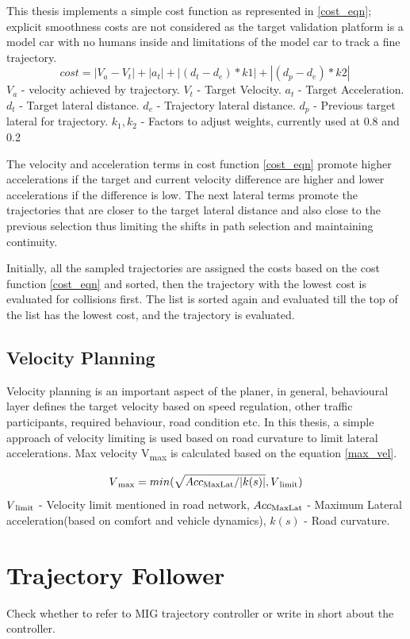 This thesis implements a simple cost function as represented in \ref{cost_eqn}; explicit smoothness costs are not considered as the target validation platform is a model car with no humans inside and limitations of the model car to track a fine trajectory. 
\begin{equation}
cost = |V_a - V_t| + |a_t| + | (d_t - d_e)*k1 | + | (d_p - d_e)*k2 |\
\label{cost_eqn}
\end{equation}
$V_a$ - velocity achieved by trajectory.
$V_t$ - Target Velocity.
$a_t$ - Target Acceleration.
$d_t$ - Target lateral distance.
$d_e$ - Trajectory lateral distance.
$d_p$ - Previous target lateral for trajectory.
$k_1,k_2$ - Factors to adjust weights, currently used at 0.8 and 0.2

The velocity and acceleration terms in cost function \ref{cost_eqn} promote higher accelerations if the target and current velocity difference are higher and lower accelerations if the difference is low. The next lateral terms promote the trajectories that are closer to the target lateral distance and also close to the previous selection thus limiting the shifts in path selection and maintaining continuity. 

Initially, all the sampled trajectories are assigned the costs based on the cost function \ref{cost_eqn} and sorted, then the trajectory with the lowest cost is evaluated for collisions first. The list is sorted again and evaluated till the top of the list has the lowest cost, and the trajectory is evaluated. 

\subsection{Velocity Planning}
Velocity planning is an important aspect of the planer, in general, behavioural layer defines the target velocity based on speed regulation, other traffic participants, required behaviour, road condition etc. In this thesis, a simple approach of velocity limiting is used based on road curvature to limit lateral accelerations. Max velocity  V\textsubscript{max} is calculated based on the equation \ref{max_vel}. 

\begin{equation}
    V\textsubscript{max} = min(\sqrt{Acc\textsubscript{MaxLat} / |k(s)|} , V\textsubscript{limit})
\label{max_vel}
\end{equation}
$V\textsubscript{limit}$ - Velocity limit mentioned in road network,
$Acc\textsubscript{MaxLat}$ - Maximum Lateral acceleration(based on comfort and vehicle dynamics),
$k(s)$ - Road curvature.

\section{Trajectory Follower} \label{traj_follower}

Check whether to refer to MIG trajectory controller or write in short about the controller. 
